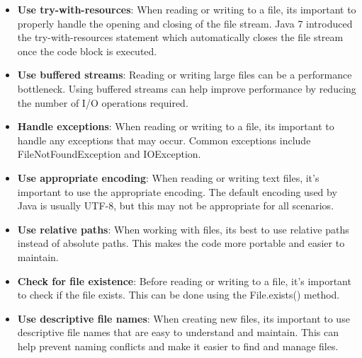 \begin{itemize}

\item \textbf{Use try-with-resources}: When reading or writing to a file, it\’s important to properly handle the opening and closing of the file stream.  Java 7 introduced the try-with-resources statement which automatically closes the file stream once the code block is executed.

\item \textbf{Use buffered streams}: Reading or writing large files can be a performance bottleneck. Using buffered streams can help improve performance by reducing the number of I/O operations required.

\item \textbf{Handle exceptions}: When reading or writing to a file, it\’s important to handle any exceptions that may occur. Common exceptions include FileNotFoundException and IOException.

\item \textbf{Use appropriate encoding}: When reading or writing text files, it’s important to use the appropriate encoding. The default encoding used by Java is usually UTF-8, but this may not be appropriate for all scenarios.

\item \textbf{Use relative paths}: When working with files, it\’s best to use relative paths instead of absolute paths. This makes the code more portable and easier to maintain.

\item \textbf{Check for file existence}: Before reading or writing to a file, it’s important to check if the file exists. This can be done using the File.exists() method.

\item \textbf{Use descriptive file names}: When creating new files, it\’s important to use descriptive file names that are easy to understand and maintain. This can help prevent naming conflicts and make it easier to find and manage files.
\end{itemize}


